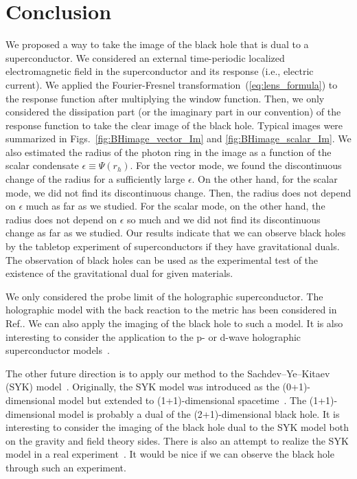 \documentclass[a4paper,11pt]{article}
\begin{document}
\section{Conclusion}
\label{sec:Conclusion}

    We proposed a way to take the image of the black hole that is dual to a superconductor.
    We considered an external time-periodic localized electromagnetic field in the superconductor and its response (i.e., electric current).
    We applied the Fourier-Fresnel transformation~(\ref{eq:lens_formula})  to the response function after multiplying the window function. 
    Then, we only considered the dissipation part (or the imaginary part in our convention) of the response function to take the clear image of the black hole.
    Typical images were summarized in Figs.~\ref{fig:BHimage_vector_Im} and \ref{fig:BHimage_scalar_Im}.
    We also estimated the radius of the photon ring in the image as a function of the scalar condensate $\epsilon\equiv \Psi(r_h)$.
    For the vector mode, we found the discontinuous change of the radius for a sufficiently large $\epsilon$.
    On the other hand, for the scalar mode, we did not find its discontinuous change. Then, the radius does not depend on $\epsilon$ much as far as we studied. 
    For the scalar mode, on the other hand, the radius  does not depend on $\epsilon$ so much and we did not find its discontinuous change as far as we studied.
    Our results indicate that we can observe black holes by the tabletop experiment of superconductors if they have gravitational duals.
    The observation of black holes can be used as the experimental test of the existence of the gravitational dual for given materials.


    We only considered the probe limit of the holographic superconductor. 
    The holographic model with the back reaction to the metric has been considered in Ref.\cite{Hartnoll:2008kx}.
    We can also apply the imaging of the black hole to such a model. 
    It is also interesting to consider the application to the p- or d-wave holographic superconductor models~\cite{Gubser:2008wv,Chen:2010mk,Benini:2010pr}.


    The other future direction is to apply our method to the Sachdev–Ye–Kitaev (SYK) model~\cite{Sachdev:1992fk,Kitaev-talk}.
    Originally, the SYK model was introduced as the (0+1)-dimensional model but extended to (1+1)-dimensional spacetime~\cite{Turiaci:2017zwd,Jian:2017unn,Das:2017pif,Murugan:2017eto,Das:2017hrt}.
    The (1+1)-dimensional model is probably a dual of the (2+1)-dimensional black hole.
    It is interesting to consider the imaging of the black hole dual to the SYK model both on the gravity and field theory sides. 
    There is also an attempt to realize the SYK model in a real experiment~\cite{Danshita:2016xbo}. 
    It would be nice if we can observe the black hole through such an experiment. 
\end{document}
